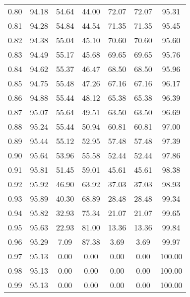 \begin{tabular}{|c|c|c|c|c|c|c|}
      0.80 &     94.18 &     54.64 &      44.00 &   72.07 &      72.07 &         95.31 \\
      0.81 &     94.28 &     54.84 &      44.54 &   71.35 &      71.35 &         95.45 \\
      0.82 &     94.38 &     55.04 &      45.10 &   70.60 &      70.60 &         95.60 \\
      0.83 &     94.49 &     55.17 &      45.68 &   69.65 &      69.65 &         95.76 \\
      0.84 &     94.62 &     55.37 &      46.47 &   68.50 &      68.50 &         95.96 \\
      0.85 &     94.75 &     55.48 &      47.26 &   67.16 &      67.16 &         96.17 \\
      0.86 &     94.88 &     55.44 &      48.12 &   65.38 &      65.38 &         96.39 \\
      0.87 &     95.07 &     55.64 &      49.51 &   63.50 &      63.50 &         96.69 \\
      0.88 &     95.24 &     55.44 &      50.94 &   60.81 &      60.81 &         97.00 \\
      0.89 &     95.44 &     55.12 &      52.95 &   57.48 &      57.48 &         97.39 \\
      0.90 &     95.64 &     53.96 &      55.58 &   52.44 &      52.44 &         97.86 \\
      0.91 &     95.81 &     51.45 &      59.01 &   45.61 &      45.61 &         98.38 \\
      0.92 &     95.92 &     46.90 &      63.92 &   37.03 &      37.03 &         98.93 \\
      0.93 &     95.89 &     40.30 &      68.89 &   28.48 &      28.48 &         99.34 \\
      0.94 &     95.82 &     32.93 &      75.34 &   21.07 &      21.07 &         99.65 \\
      0.95 &     95.63 &     22.93 &      81.00 &   13.36 &      13.36 &         99.84 \\
      0.96 &     95.29 &      7.09 &      87.38 &    3.69 &       3.69 &         99.97 \\
      0.97 &     95.13 &      0.00 &       0.00 &    0.00 &       0.00 &        100.00 \\
      0.98 &     95.13 &      0.00 &       0.00 &    0.00 &       0.00 &        100.00 \\
      0.99 &     95.13 &      0.00 &       0.00 &    0.00 &       0.00 &        100.00 \\
\bottomrule
\end{tabular}
